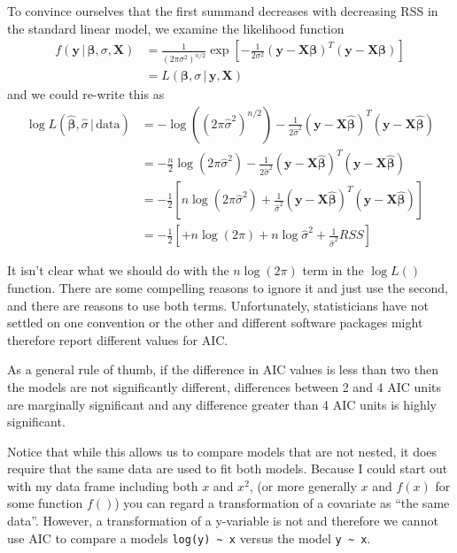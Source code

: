 \documentclass[]{book}
\theoremstyle{definition}
\theoremstyle{definition}
\theoremstyle{remark}
\begin{document}
To convince ourselves that the first summand decreases with decreasing
RSS in the standard linear model, we examine the likelihood function
\[\begin{aligned}
f\left(\boldsymbol{y}\,|\,\boldsymbol{\beta},\sigma,\boldsymbol{X}\right)   &=  \frac{1}{\left(2\pi\sigma^{2}\right)^{n/2}}\exp\left[-\frac{1}{2\sigma^{2}}\left(\boldsymbol{y}-\boldsymbol{X}\boldsymbol{\beta}\right)^{T}\left(\boldsymbol{y}-\boldsymbol{X}\boldsymbol{\beta}\right)\right] \\
    &=  L\left(\boldsymbol{\beta},\sigma\,|\,\boldsymbol{y},\boldsymbol{X}\right)
\end{aligned}\] and we could re-write this as \[\begin{aligned}
\log L\left(\hat{\boldsymbol{\beta}},\hat{\sigma}\,|\,\textrm{data}\right)  &=  -\log\left(\left(2\pi\hat{\sigma}^{2}\right)^{n/2}\right)-\frac{1}{2\hat{\sigma}^{2}}\left(\boldsymbol{y}-\boldsymbol{X}\hat{\boldsymbol{\beta}}\right)^{T}\left(\boldsymbol{y}-\boldsymbol{X}\hat{\boldsymbol{\beta}}\right) \\
    &=  -\frac{n}{2}\log\left(2\pi\hat{\sigma}^{2}\right)-\frac{1}{2\hat{\sigma}^{2}}\left(\boldsymbol{y}-\boldsymbol{X}\hat{\boldsymbol{\beta}}\right)^{T}\left(\boldsymbol{y}-\boldsymbol{X}\hat{\boldsymbol{\beta}}\right) \\
    &=  -\frac{1}{2}\left[n\log\left(2\pi\hat{\sigma}^{2}\right)+\frac{1}{\hat{\sigma}^{2}}\left(\boldsymbol{y}-\boldsymbol{X}\hat{\boldsymbol{\beta}}\right)^{T}\left(\boldsymbol{y}-\boldsymbol{X}\hat{\boldsymbol{\beta}}\right)\right] \\
    &=  -\frac{1}{2}\left[+n\log\left(2\pi\right)+n\log\hat{\sigma}^{2}+\frac{1}{\hat{\sigma}^{2}}RSS\right]
\end{aligned}\]

It isn't clear what we should do with the \(n\log\left(2\pi\right)\)
term in the \(\log L()\) function. There are some compelling reasons to
ignore it and just use the second, and there are reasons to use both
terms. Unfortunately, statisticians have not settled on one convention
or the other and different software packages might therefore report
different values for AIC.

As a general rule of thumb, if the difference in AIC values is less than
two then the models are not significantly different, differences between
2 and 4 AIC units are marginally significant and any difference greater
than 4 AIC units is highly significant.

Notice that while this allows us to compare models that are not nested,
it does require that the same data are used to fit both models. Because
I could start out with my data frame including both \(x\) and \(x^{2}\),
(or more generally \(x\) and \(f\left(x\right)\) for some function
\(f()\)) you can regard a transformation of a covariate as ``the same
data''. However, a transformation of a y-variable is not and therefore
we cannot use AIC to compare a models
\texttt{log(y)\ \textasciitilde{}\ x} versus the model
\texttt{y\ \textasciitilde{}\ x}.
\end{document}
